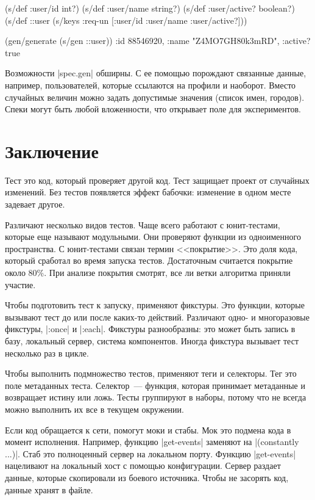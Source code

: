 \begin{english}
  \begin{clojure}
(s/def :user/id int?)
(s/def :user/name string?)
(s/def :user/active? boolean?)
(s/def ::user (s/keys :req-un [:user/id :user/name :user/active?]))

(gen/generate (s/gen ::user))
{:id 88546920, :name "Z4MO7GH80k3mRD", :active? true}
  \end{clojure}
\end{english}

Возможности \spverb|spec.gen| обширны. С ее помощью порождают связанные данные,
например, пользователей, которые ссылаются на профили и наоборот. Вместо
случайных величин можно задать допустимые значения (список имен, городов). Спеки
могут быть любой вложенности, что открывает поле для экспериментов.

\section{Заключение}

Тест это код, который проверяет другой код. Тест защищает проект от случайных
изменений. Без тестов появляется эффект бабочки: изменение в одном месте
задевает другое.

Различают несколько видов тестов. Чаще всего работают с юнит-тестами, которые
еще называют модульными. Они проверяют функции из одноименного пространства. С
юнит-тестами связан термин <<покрытие>>. Это доля кода, который сработал во
время запуска тестов. Достаточным считается покрытие около 80\%. При анализе
покрытия смотрят, все ли ветки алгоритма приняли участие.

Чтобы подготовить тест к запуску, применяют фикстуры. Это функции, которые
вызывают тест до или после каких-то действий. Различают одно- и многоразовые
фикстуры, \spverb|:once| и \spverb|:each|. Фикстуры разнообразны: это может быть
запись в базу, локальный сервер, система компонентов. Иногда фикстура вызывает
тест несколько раз в цикле.

Чтобы выполнить подмножество тестов, применяют теги и селекторы. Тег это поле
метаданных теста. Селектор~--- функция, которая принимает метаданные и
возвращает истину или ложь. Тесты группируют в наборы, потому что не всегда
можно выполнить их все в текущем окружении.

Если код обращается к сети, помогут моки и стабы. Мок это подмена кода в момент
исполнения. Например, функцию \spverb|get-events| заменяют на
\spverb|(constantly {...})|.  Стаб это полноценный сервер на локальном
порту. Функцию \spverb|get-events| нацеливают на локальный хост с помощью
конфигурации. Сервер раздает данные, которые скопировали из боевого
источника. Чтобы не засорять код, данные хранят в файле.

